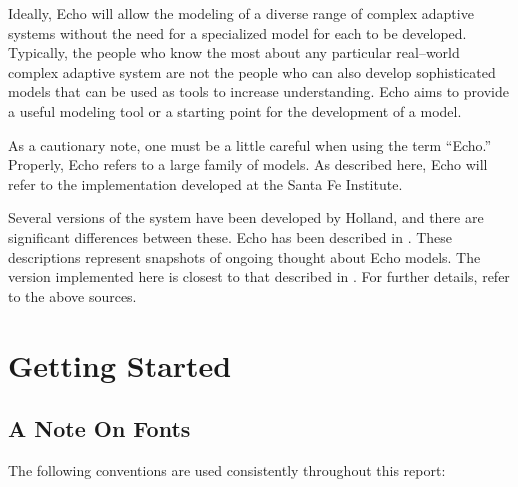 Ideally, Echo will allow the modeling of a diverse range of complex
adaptive systems without the need for a specialized model for each to
be developed. Typically, the people who know the most about any
particular real--world complex adaptive system are not the people who
can also develop sophisticated models that can be used as tools to
increase understanding. Echo aims to provide a useful modeling tool or
a starting point for the development of a model.

As a cautionary note, one must be a little careful when using the term
``Echo.''  Properly, Echo refers to a large family of models. As
described here, Echo will refer to the implementation developed at the
Santa Fe Institute.

Several versions of the system have been developed by Holland, and
there are significant differences between these. Echo has been
described in
\cite{holland-92a,holland-92b,holland-93}. These descriptions
represent snapshots of ongoing thought about Echo models. The version
implemented here is closest to that described in \cite{holland-92a}.
For further details, refer to the above sources.

\section{Getting Started}

\subsection{A Note On Fonts}

The following conventions are used consistently throughout this
report:

